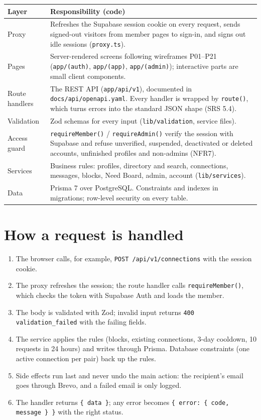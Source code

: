 \documentclass[10pt,a4paper]{article}
\begin{document}
\begin{tabularx}{\linewidth}{@{}l >{\raggedright\arraybackslash}X@{}}
\toprule
\textbf{Layer} & \textbf{Responsibility (code)}\\
\midrule
Proxy & Refreshes the Supabase session cookie on every request, sends signed-out visitors from member pages to sign-in, and signs out idle sessions (\texttt{proxy.ts}).\\
Pages & Server-rendered screens following wireframes P01--P21 (\texttt{app/(auth)}, \texttt{app/(app)}, \texttt{app/(admin)}); interactive parts are small client components.\\
Route handlers & The REST API (\texttt{app/api/v1}), documented in \texttt{docs/api/openapi.yaml}. Every handler is wrapped by \texttt{route()}, which turns errors into the standard JSON shape (SRS 5.4).\\
Validation & Zod schemas for every input (\texttt{lib/validation}, service files).\\
Access guard & \texttt{requireMember()} / \texttt{requireAdmin()} verify the session with Supabase and refuse unverified, suspended, deactivated or deleted accounts, unfinished profiles and non-admins (NFR7).\\
Services & Business rules: profiles, directory and search, connections, messages, blocks, Need Board, admin, account (\texttt{lib/services}).\\
Data & Prisma 7 over PostgreSQL. Constraints and indexes in migrations; row-level security on every table.\\
\bottomrule
\end{tabularx}

\section{How a request is handled}
\begin{enumerate}
\item The browser calls, for example, \texttt{POST /api/v1/connections} with the session cookie.
\item The proxy refreshes the session; the route handler calls \texttt{requireMember()}, which checks the token with Supabase Auth and loads the member.
\item The body is validated with Zod; invalid input returns \texttt{400 validation\_failed} with the failing fields.
\item The service applies the rules (blocks, existing connections, 3-day cooldown, 10 requests in 24 hours) and writes through Prisma. Database constraints (one active connection per pair) back up the rules.
\item Side effects run last and never undo the main action: the recipient's email goes through Brevo, and a failed email is only logged.
\item The handler returns \texttt{\{ data \}}; any error becomes \texttt{\{ error: \{ code, message \} \}} with the right status.
\end{enumerate}
\end{document}
